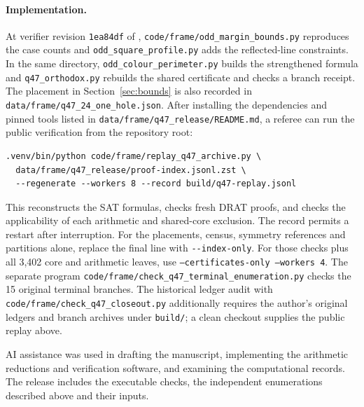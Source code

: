 \documentclass[11pt]{article}
\newcommand{\file}[1]{\nolinkurl{#1}}
\begin{document}
\paragraph{Implementation.}
At verifier revision \texttt{1ea84df} of \cite{software}, \file{code/frame/odd_margin_bounds.py}
reproduces the case counts and \file{odd_square_profile.py} adds the
reflected-line constraints. In the same directory,
\file{odd_colour_perimeter.py} builds the strengthened formula and
\file{q47_orthodox.py} rebuilds the shared certificate and checks a branch
receipt. The placement in Section~\ref{sec:bounds} is also recorded in
\file{data/frame/q47_24_one_hole.json}.
After installing the dependencies and pinned tools listed in
\file{data/frame/q47_release/README.md}, a referee can run the public
verification from the repository root:
\begin{verbatim}
.venv/bin/python code/frame/replay_q47_archive.py \
  data/frame/q47_release/proof-index.jsonl.zst \
  --regenerate --workers 8 --record build/q47-replay.jsonl
\end{verbatim}
This reconstructs the SAT formulas, checks fresh DRAT proofs, and checks
the applicability of each arithmetic and shared-core exclusion. The
record permits a restart after interruption. For the placements, census,
symmetry references and partitions alone, replace the final line with
\file{--index-only}. For those checks plus all 3,402 core and arithmetic
leaves, use \texttt{--certificates-only --workers 4}.
The separate program \file{code/frame/check_q47_terminal_enumeration.py}
checks the 15 original terminal branches. The historical ledger audit
with \file{code/frame/check_q47_closeout.py} additionally requires the
author's original ledgers and branch archives under \file{build/};
a clean checkout supplies the public replay above.

AI assistance was used in drafting the manuscript, implementing
the arithmetic reductions and verification software, and examining
the computational records. The release includes the executable checks,
the independent enumerations described above and their inputs.

\appendix
\end{document}
